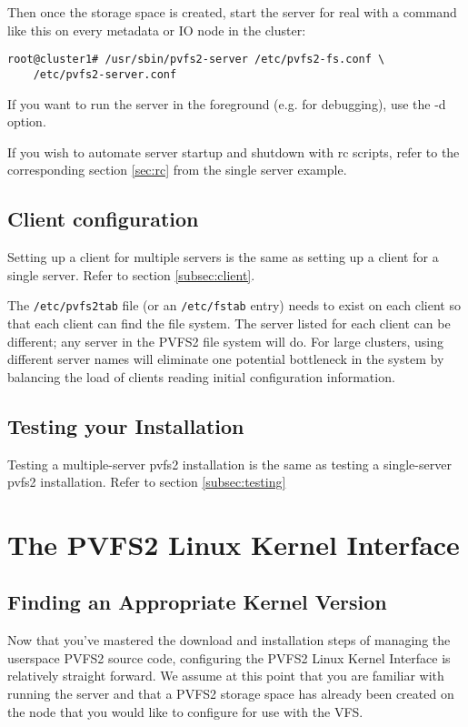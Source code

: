 \documentclass[11pt, letterpaper]{article}
\begin{document}
Then once the storage space is created, start the server for real with a
command like this on every metadata or IO node in the cluster:

\begin{verbatim}
root@cluster1# /usr/sbin/pvfs2-server /etc/pvfs2-fs.conf \
	/etc/pvfs2-server.conf
\end{verbatim}

If you want to run the server in the foreground (e.g. for debugging), use the
-d option.

If you wish to automate server startup and shutdown with rc scripts, refer
to the corresponding section \ref{sec:rc} from the single server example.

\subsection{Client configuration}

Setting up a client for multiple servers is the same as setting up a client
for a single server.  Refer to section \ref{subsec:client}.

The \texttt{/etc/pvfs2tab} file (or an \texttt{/etc/fstab} entry) needs to
exist on each client so that each client can find the file system.  The server
listed for each client can be different; any server in the PVFS2 file system
will do.  For large clusters, using different server names will eliminate one
potential bottleneck in the system by balancing the load of clients reading
initial configuration information.

\subsection {Testing your Installation}

Testing a multiple-server pvfs2 installation is the same as testing a
single-server pvfs2 installation.  Refer to section
\ref{subsec:testing}

\section{The PVFS2 Linux Kernel Interface}
\label{sec:kernel-interface}

\subsection{Finding an Appropriate Kernel Version}
\label{sec:kernel-check}

Now that you've mastered the download and installation steps of
managing the userspace PVFS2 source code, configuring the PVFS2 Linux
Kernel Interface is relatively straight forward.  We assume at this
point that you are familiar with running the server and that a PVFS2
storage space has already been created on the node that you would like
to configure for use with the VFS.
\end{document}
